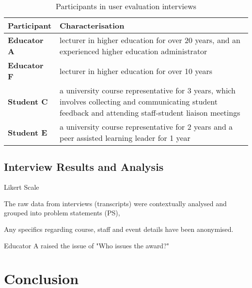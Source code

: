 \begin{table}[!h] 
    \caption{Participants in user evaluation interviews}
    \centering
    \label{table:participants-eval}
    \begin{tabularx}{\textwidth}{>{\bfseries}lX}
        Participant & Characterisation\\
        \toprule
        Educator A & lecturer in higher education for over 20 years, and an experienced higher education 
        administrator\\\midrule
        Educator F & lecturer in higher education for over 10 years\\\midrule
        Student C & a university course representative for 3 years, which involves collecting and 
        communicating student feedback and attending staff-student liaison meetings \\\midrule
        Student E & a university course representative for 2 years and a peer assisted learning leader 
        for 1 year\\\bottomrule
    \end{tabularx}
\end{table}


\subsection{Interview Results and Analysis}

Likert Scale

The raw data from interviews (transcripts) were contextually analysed and grouped into problem statements (PS), 

Any specifics regarding course, staff and event details have been anonymised.

Educator A raised the issue of "Who issues the award?"

\section{Conclusion}